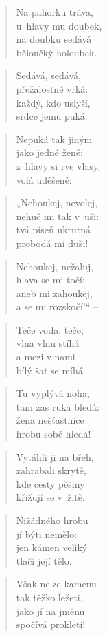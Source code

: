 \begin{verse}
Na pahorku tráva, \\
u~hlavy mu doubek, \\
na doubku sedává \\
běloučký holoubek.
\end{verse}

\begin{verse}
Sedává, sedává, \\
přežalostně vrká: \\
každý, kdo uslyší, \\
srdce jemu puká.
\end{verse}

\begin{verse}
Nepuká tak jiným \\
jako jedné ženě: \\
z~hlavy si rve vlasy, \\
volá uděšeně:
\end{verse}

\begin{verse}
„Nehoukej, nevolej, \\
nehuč mi tak v~uši: \\
tvá píseň ukrutná \\
probodá mi duši!
\end{verse}

\begin{verse}
Nehoukej, nežaluj, \\
hlava se mi točí; \\
aneb mi zahoukej, \\
a se mi rozskočí!“ --
\end{verse}

\begin{verse}
Teče voda, teče, \\
vlna vlnu stíhá \\
a mezi vlnami \\
bílý šat se míhá.
\end{verse}

\begin{verse}
Tu vyplývá noha, \\
tam zas ruka bledá: \\
žena nešťastnice \\
hrobu sobě hledá!
\end{verse}

\begin{verse}
Vytáhli ji na břeh, \\
zahrabali skrytě, \\
kde cesty pěšiny \\
křižují se v~žitě.
\end{verse}

\begin{verse}
Nižádného hrobu \\
jí býti nemělo: \\
jen kámen veliký \\
tlačí její tělo.
\end{verse}

\begin{verse}
Však nelze kamenu \\
tak těžko ležeti, \\
jako jí na jménu \\
spočívá prokletí!
\end{verse}

